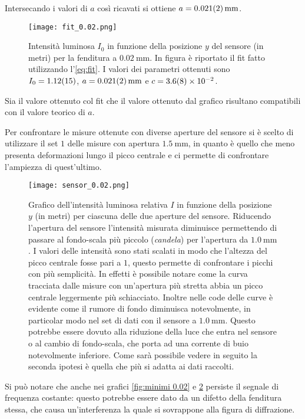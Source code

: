 \documentclass[../main.tex]{subfiles}
\begin{document}
Intersecando i valori di $a$ così ricavati si ottiene $a = \qty{0.021+-0.002}{\mm}$.


\begin{figure}[ht!]
    \centering
    \texttt{[image: fit\_0.02.png]}
    \caption{Intensità luminosa $I_{0}$ in funzione della posizione $y$ del sensore (in metri) per la fenditura a $\qty{0.02}{\mm}$. In figura è riportato il fit fatto utilizzando l'\autoref{eq:fit}. I valori dei parametri ottenuti sono $I_{0} = \num{1.12+-0.15}$, $a = \qty{0.021+-0.002}{\mm}$ e $c = \num{3.6+-0.8e-2}$.}
    \label{fig:fit 0.02}
\end{figure}

Sia il valore ottenuto col fit che il valore ottenuto dal grafico risultano compatibili con il valore teorico di $a$.

Per confrontare le misure ottenute con diverse aperture del sensore si è scelto di utilizzare il set $1$ delle misure con apertura $\qty{1.5}{\mm}$, in quanto è quello che meno presenta deformazioni lungo il picco centrale e ci permette di confrontare l'ampiezza di quest'ultimo.

\begin{figure}[ht!]
    \centering
    \texttt{[image: sensor\_0.02.png]}
    \caption{Grafico dell'intensità luminosa relativa $I$ in funzione della posizione $y$ (in metri) per ciascuna delle due aperture del sensore.
        Riducendo l'apertura del sensore l'intensità misurata diminuisce permettendo di passare al fondo-scala più piccolo (\textit{candela}) per l'apertura da $\qty{1.0}{\mm}$.
        I valori delle intensità sono stati scalati in modo che l'altezza del picco centrale fosse pari a $1$, questo permette di confrontare i picchi con più semplicità. In effetti è possibile notare come la curva tracciata dalle misure con un'apertura più stretta abbia un picco centrale leggermente più schiacciato.
        Inoltre nelle code delle curve è evidente come il rumore di fondo diminuisca notevolmente, in particolar modo nel set di dati con il sensore a $\qty{1.0}{\mm}$. Questo potrebbe essere dovuto alla riduzione della luce che entra nel sensore o al cambio di fondo-scala, che porta ad una corrente di buio notevolmente inferiore.
        Come sarà possibile vedere in seguito la seconda ipotesi è quella che più si adatta ai dati raccolti.} %
    \label{fig:sensore 0.02}
\end{figure}

Si può notare che anche nei grafici \ref{fig:minimi 0.02} e \ref{fig:sensore 0.02} persiste il segnale di frequenza costante: questo potrebbe essere dato da un difetto della fenditura stessa, che causa un'interferenza la quale si sovrappone alla figura di diffrazione.
\end{document}
